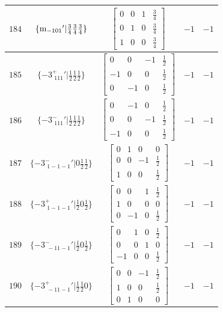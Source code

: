 \documentclass[fleqn,8pt]{jsarticle}
\begin{document}
\begin{longtable}{ccccc}
$ 184 $ & $ \{{\rm m}_{-101}{}'|\frac{3}{4} \frac{3}{4} \frac{3}{4}\} $ & $ \begin{bmatrix} 0 & 0 & 1 & \frac{3}{4} \\ 0 & 1 & 0 & \frac{3}{4} \\ 1 & 0 & 0 & \frac{3}{4} \end{bmatrix} $ & $ -1 $ & $ -1 $ \\ \hline
$ 185 $ & $ \{-3^{+}_{\,\,111}{}'|\frac{1}{2} \frac{1}{2} \frac{1}{2}\} $ & $ \begin{bmatrix} 0 & 0 & -1 & \frac{1}{2} \\ -1 & 0 & 0 & \frac{1}{2} \\ 0 & -1 & 0 & \frac{1}{2} \end{bmatrix} $ & $ -1 $ & $ -1 $ \\ \hline
$ 186 $ & $ \{-3^{-}_{\,\,111}{}'|\frac{1}{2} \frac{1}{2} \frac{1}{2}\} $ & $ \begin{bmatrix} 0 & -1 & 0 & \frac{1}{2} \\ 0 & 0 & -1 & \frac{1}{2} \\ -1 & 0 & 0 & \frac{1}{2} \end{bmatrix} $ & $ -1 $ & $ -1 $ \\ \hline
$ 187 $ & $ \{-3^{-}_{\,\,1-1-1}{}'|0 \frac{1}{2} \frac{1}{2}\} $ & $ \begin{bmatrix} 0 & 1 & 0 & 0 \\ 0 & 0 & -1 & \frac{1}{2} \\ 1 & 0 & 0 & \frac{1}{2} \end{bmatrix} $ & $ -1 $ & $ -1 $ \\ \hline
$ 188 $ & $ \{-3^{+}_{\,\,1-1-1}{}'|\frac{1}{2} 0 \frac{1}{2}\} $ & $ \begin{bmatrix} 0 & 0 & 1 & \frac{1}{2} \\ 1 & 0 & 0 & 0 \\ 0 & -1 & 0 & \frac{1}{2} \end{bmatrix} $ & $ -1 $ & $ -1 $ \\ \hline
$ 189 $ & $ \{-3^{-}_{\,\,-11-1}{}'|\frac{1}{2} 0 \frac{1}{2}\} $ & $ \begin{bmatrix} 0 & 1 & 0 & \frac{1}{2} \\ 0 & 0 & 1 & 0 \\ -1 & 0 & 0 & \frac{1}{2} \end{bmatrix} $ & $ -1 $ & $ -1 $ \\ \hline
$ 190 $ & $ \{-3^{+}_{\,\,-11-1}{}'|\frac{1}{2} \frac{1}{2} 0\} $ & $ \begin{bmatrix} 0 & 0 & -1 & \frac{1}{2} \\ 1 & 0 & 0 & \frac{1}{2} \\ 0 & 1 & 0 & 0 \end{bmatrix} $ & $ -1 $ & $ -1 $ \\ \hline

\end{longtable}
\end{document}
